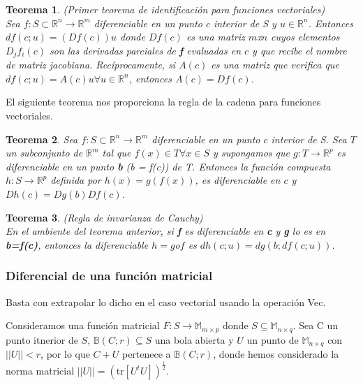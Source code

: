 \documentclass{article}
\theoremstyle{theorem-style}  %
\newtheorem{theorem}{Teorema}[section]  %
\theoremstyle{definition}
\theoremstyle{example-style}
\begin{document}
\begin{theorem} (Primer teorema de identificación para funciones vectoriales)\\
	Sea $f: S\subset \mathbb{R}^n \rightarrow \mathbb{R}^m$ diferenciable en un punto $c$ interior de S y $u  \in \mathbb{R}^n$. Entonces $df(c;u)=(Df(c))u$ donde $Df(c)$ es una matriz $m$x$n$ cuyos elementos $D_jf_i(c)$ son las derivadas parciales de \textbf{f} evaluadas en $c$ y que recibe el nombre de matriz jacobiana. Recíprocamente, si $A(c)$ es una matriz que verifica que $df(c;u)=A(c)u \forall u\in \mathbb{R}^n$, entonces $A(c) = Df(c)$. 
\end{theorem}

El siguiente teorema nos proporciona la regla de la cadena para funciones vectoriales.

\begin{theorem}
	Sea $f: S\subset \mathbb{R}^n \rightarrow \mathbb{R}^m$ diferenciable en un punto $c$ interior de S. Sea $T$ un subconjunto de $\mathbb{R}^m$ tal que $f(x) \in T \forall x \in S$ y supongamos que $g: T \rightarrow \mathbb{R}^p$ es diferenciable en un punto \textbf{b} (b = f(c)) de T. Entonces la función compuesta $h: S \rightarrow \mathbb{R}^p$ definida por $h(x)=g(f(x))$, es diferenciable en $c$ y $Dh(c)=Dg(b)Df(c)$.
\end{theorem}

\begin{theorem} (Regla de invarianza de Cauchy) \\
	En el ambiente del teorema anterior, si \textbf{f} es diferenciable en \textbf{c} y \textbf{g} lo es en \textbf{b=f(c)}, entonces la diferenciable $h=g$o$f$ es $dh(c;u) = dg(b;df(c;u))$.   
	
\end{theorem}

\subsubsection{Diferencial de una función matricial}

Basta con extrapolar lo dicho en el caso vectorial usando la operación Vec.

Consideramos una función matricial $F: S \rightarrow \mathbb{M}_{m\times p}$ donde $S \subseteq \mathbb{M}_{n\times q}$. Sea C un punto itnerior de $S$, $\mathbb{B}(C;r) \subseteq S$ una bola abierta y $U$ un punto de $\mathbb{M}_{n\times q}$ con $||U||<r$, por lo que $C+U$ pertenece a $\mathbb{B}(C;r)$, donde hemos considerado la norma matricial $||U||=(\text{tr}[U^tU])^{\frac{1}{2}}$.
\end{document}
